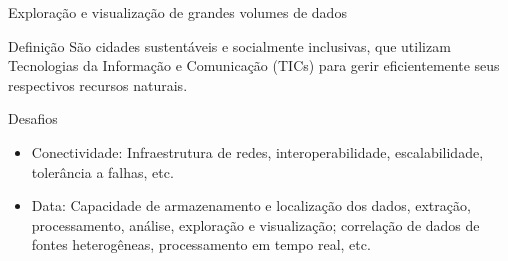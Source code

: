\documentclass{beamer}
\begin{document}
\begin{frame}{Exploração e visualização de grandes volumes de dados}
\begin{block}{Definição}
São cidades sustentáveis e socialmente inclusivas, que utilizam Tecnologias da Informação e Comunicação (TICs) para gerir eficientemente seus respectivos recursos naturais.
\end{block}
\begin{block}{Desafios}
    \begin{itemize}
        \item \alert{Conectividade:} Infraestrutura de redes, interoperabilidade, escalabilidade, tolerância a falhas, etc.
        \item \alert{Data:} Capacidade de armazenamento e localização dos dados, extração, processamento, análise, exploração e visualização; correlação de dados de fontes heterogêneas, processamento em tempo real, etc.
    \end{itemize}
\end{block}
\end{frame}
\end{document}

